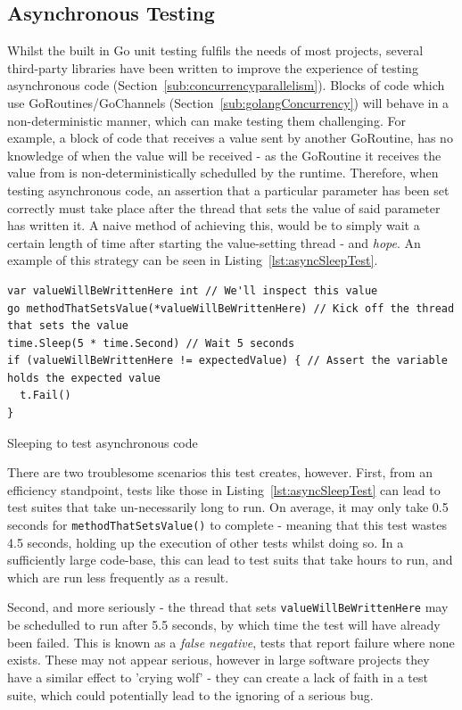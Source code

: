 \subsection{Asynchronous Testing}
\label{sub:asyncTesting}

Whilst the built in Go unit testing fulfils the needs of most projects, several
third-party libraries have been written to improve the experience of testing
asynchronous code (Section~\ref{sub:concurrencyparallelism}). Blocks of code
which use GoRoutines/GoChannels (Section~\ref{sub:golangConcurrency}) will
behave in a non-deterministic manner, which can make testing them challenging.
For example, a block of code that receives a value sent by another GoRoutine,
has no knowledge of when the value will be received - as the GoRoutine it
receives the value from is non-deterministically schedulled by the runtime.
Therefore, when testing asynchronous code, an assertion that a particular
parameter has been set correctly must take place after the thread that sets the
value of said parameter has written it. A naive method of achieving this, would
be to simply wait a certain length of time after starting the value-setting
thread - and \emph{hope}. An example of this strategy can be seen in
Listing~\ref{lst:asyncSleepTest}.

\begin{listing}[H]
  \centering
  \begin{verbatim}
var valueWillBeWrittenHere int // We'll inspect this value
go methodThatSetsValue(*valueWillBeWrittenHere) // Kick off the thread that sets the value
time.Sleep(5 * time.Second) // Wait 5 seconds
if (valueWillBeWrittenHere != expectedValue) { // Assert the variable holds the expected value
  t.Fail()
}
  \end{verbatim}
  \caption{Sleeping to test asynchronous code}
  \label{lst:asyncSleepTest}
\end{listing}

There are two troublesome scenarios this test creates, however. First, from an
efficiency standpoint, tests like those in Listing~\ref{lst:asyncSleepTest} can
lead to test suites that take un-necessarily long to run. On average, it may
only take 0.5 seconds for \texttt{methodThatSetsValue()} to complete -
meaning that this test wastes 4.5 seconds, holding up the execution of other
tests whilst doing so. In a sufficiently large code-base, this can lead to test
suits that take hours to run, and which are run less frequently as a result.

Second, and more seriously - the thread that sets
\texttt{valueWillBeWrittenHere} may be schedulled to run after 5.5
seconds, by which time the test will have already been failed. This is known
as a \emph{\gls{false negative}}, tests that report failure where none exists.
These may not appear serious, however in large software projects they have a
similar effect to 'crying wolf' - they can create a lack of faith in a test
suite, which could potentially lead to the ignoring of a serious bug.

